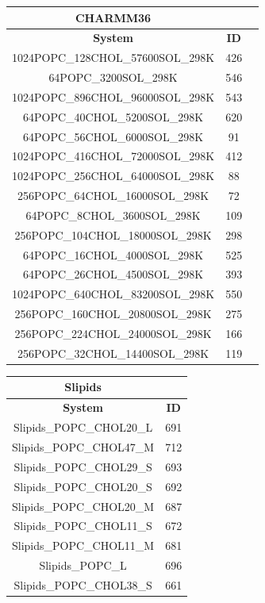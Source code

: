 \documentclass[journal=jpcbfk]{achemso}
\begin{document}
\clearpage

\begin{table}[]
\begin{tabular}{ccc}
\textbf{CHARMM36} \\
\toprule
\textbf{System} & \textbf{ID} \\
\midrule
1024POPC\_128CHOL\_57600SOL\_298K  &  426 \\ 
64POPC\_3200SOL\_298K  &  546 \\ 
1024POPC\_896CHOL\_96000SOL\_298K  &  543 \\ 
64POPC\_40CHOL\_5200SOL\_298K  &  620 \\ 
64POPC\_56CHOL\_6000SOL\_298K  &  91 \\ 
1024POPC\_416CHOL\_72000SOL\_298K  &  412 \\ 
1024POPC\_256CHOL\_64000SOL\_298K  &  88 \\ 
256POPC\_64CHOL\_16000SOL\_298K  &  72 \\ 
64POPC\_8CHOL\_3600SOL\_298K  &  109 \\ 
256POPC\_104CHOL\_18000SOL\_298K  &  298 \\ 
64POPC\_16CHOL\_4000SOL\_298K  &  525 \\ 
64POPC\_26CHOL\_4500SOL\_298K  &  393 \\ 
1024POPC\_640CHOL\_83200SOL\_298K  &  550 \\ 
256POPC\_160CHOL\_20800SOL\_298K  &  275 \\ 
256POPC\_224CHOL\_24000SOL\_298K  &  166 \\ 
256POPC\_32CHOL\_14400SOL\_298K  &  119 \\ 
\end{tabular}
\quad
\begin{tabular}{cc}
\textbf{Slipids} \\
\toprule
\textbf{System} & \textbf{ID} \\
\midrule
Slipids\_POPC\_CHOL20\_L  &  691 \\ 
Slipids\_POPC\_CHOL47\_M  &  712 \\ 
Slipids\_POPC\_CHOL29\_S  &  693 \\ 
Slipids\_POPC\_CHOL20\_S  &  692 \\ 
Slipids\_POPC\_CHOL20\_M  &  687 \\ 
Slipids\_POPC\_CHOL11\_S  &  672 \\ 
Slipids\_POPC\_CHOL11\_M  &  681 \\ 
Slipids\_POPC\_L  &  696 \\ 
Slipids\_POPC\_CHOL38\_S  &  661 \\ 

\end{tabular}
\end{table}
\end{document}
